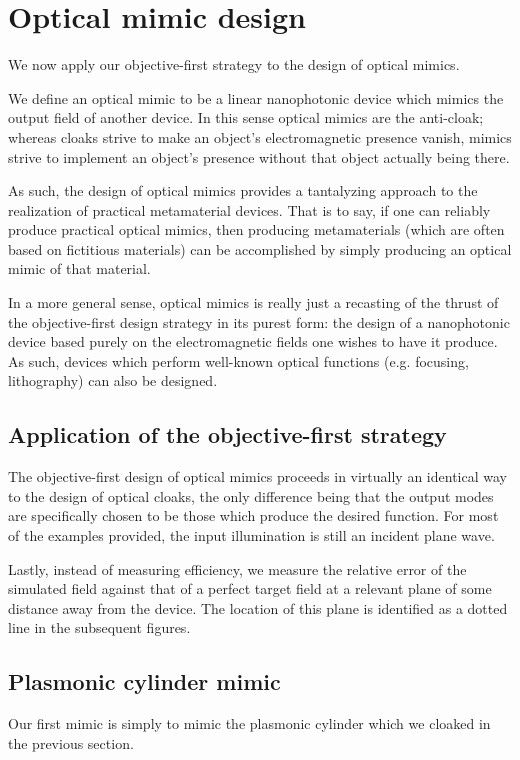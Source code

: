 \section{Optical mimic design}
We now apply our objective-first strategy to the design of optical mimics.

We define an optical mimic to be a linear nanophotonic device which 
    mimics the output field of another device.
In this sense optical mimics are the anti-cloak;
    whereas cloaks strive to make an object's electromagnetic presence vanish,
    mimics strive to implement an object's presence without that 
    object actually being there.

As such, the design of optical mimics provides a tantalyzing approach
    to the realization of practical metamaterial devices.
That is to say, if one can reliably produce practical optical mimics,
    then producing metamaterials (which are often based on fictitious materials)
    can be accomplished by simply producing an optical mimic of that material.

In a more general sense, 
    optical mimics is really just a recasting of the thrust of 
    the objective-first design strategy in its purest form:
    the design of a nanophotonic device based purely 
    on the electromagnetic fields one wishes to have it produce.
As such, devices which perform well-known optical functions
    (e.g. focusing, lithography) can also be designed.

\subsection{Application of the objective-first strategy}
The objective-first design of optical mimics proceeds in virtually
    an identical way to the design of optical cloaks,
    the only difference being that the output modes are 
    specifically chosen to be those which produce the desired function.
For most of the examples provided, the input illumination is still an incident plane wave.

Lastly, instead of measuring efficiency, 
    we measure the relative error of the simulated field
    against that of a perfect target field
    at a relevant plane of some distance away from the device.
The location of this plane is identified as a dotted line in the subsequent figures.

\subsection{Plasmonic cylinder mimic}
Our first mimic is simply to mimic the plasmonic cylinder 
    which we cloaked in the previous section.

